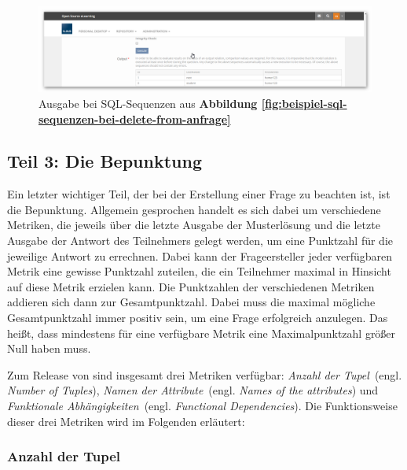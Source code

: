         \begin{figure}[H]
            \begin{center}
                \includegraphics[page=1, width=0.7\paperwidth, trim=4 4 4 4, clip]{fig/Beispiel-Ausgabe-DELETE-FROM.png} 
                \caption{Ausgabe bei SQL-Sequenzen aus \textbf{Abbildung \ref{fig:beispiel-sql-sequenzen-bei-delete-from-anfrage}}}
                \label{fig:beispiel-ausgabe-delete-from-anfrage}
            \end{center}
        \end{figure}
        
\subsection{Teil 3: Die Bepunktung}

        Ein letzter wichtiger Teil, der bei der Erstellung einer Frage zu beachten ist, ist die Bepunktung. Allgemein gesprochen handelt es sich dabei um verschiedene Metriken, die jeweils über die letzte Ausgabe der Musterlösung und die letzte Ausgabe der Antwort des Teilnehmers gelegt werden, um eine Punktzahl für die jeweilige Antwort zu errechnen. Dabei kann der Frageersteller jeder verfügbaren Metrik eine gewisse Punktzahl zuteilen, die ein Teilnehmer maximal in Hinsicht auf diese Metrik erzielen kann. Die Punktzahlen der verschiedenen Metriken addieren sich dann zur Gesamtpunktzahl. Dabei muss die maximal mögliche Gesamtpunktzahl immer positiv sein, um eine Frage erfolgreich anzulegen. Das heißt, dass mindestens für eine verfügbare Metrik eine Maximalpunktzahl größer Null haben muss. 
        
        Zum Release von  sind insgesamt drei Metriken verfügbar: \glqq\textit{Anzahl der Tupel}\grqq\ (engl. \glqq\textit{Number of Tuples}\grqq), \glqq\textit{Namen der Attribute}\grqq\ (engl. \glqq\textit{Names of the attributes}\grqq) und \glqq\textit{Funktionale Abhängigkeiten}\grqq\ (engl. \glqq\textit{Functional Dependencies}\grqq). Die Funktionsweise dieser drei Metriken wird im Folgenden erläutert:
        
        \subsubsection{Anzahl der Tupel}
        
